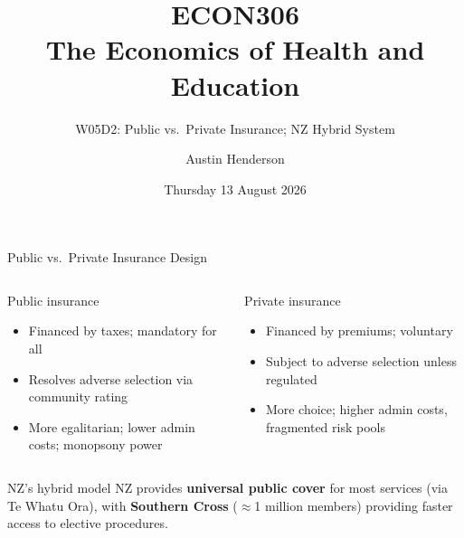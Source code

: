 \documentclass[aspectratio=169, 12pt]{beamer}
\title[ECON306: W05D2 — Moral Hazard \& Adverse Selection]{ECON306\\The Economics of Health and Education}
\subtitle{W05D2: Public vs.\ Private Insurance; NZ Hybrid System}
\author{Austin Henderson}
\institute{Department of Economics\\University of Otago}
\date{Thursday 13 August 2026}
\begin{document}
\begin{frame}[plain]
  \titlepage
\end{frame}



\begin{frame}{Public vs.\ Private Insurance Design}
  \begin{columns}
      \begin{block}{Public insurance}
        \small
        \begin{itemize}
          \item Financed by taxes; mandatory for all
          \item Resolves adverse selection via community rating
          \item More egalitarian; lower admin costs; monopsony power
        \end{itemize}
      \end{block}
      \begin{alertblock}{Private insurance}
        \small
        \begin{itemize}
          \item Financed by premiums; voluntary
          \item Subject to adverse selection unless regulated
          \item More choice; higher admin costs, fragmented risk pools
        \end{itemize}
      \end{alertblock}
  \end{columns}
  \begin{exampleblock}{NZ's hybrid model}
    \small NZ provides \textbf{universal public cover} for most services (via Te Whatu Ora),
    with \textbf{Southern Cross} ($\approx$1 million members) providing faster access to
    elective procedures.
  \end{exampleblock}
\end{frame}
\end{document}
